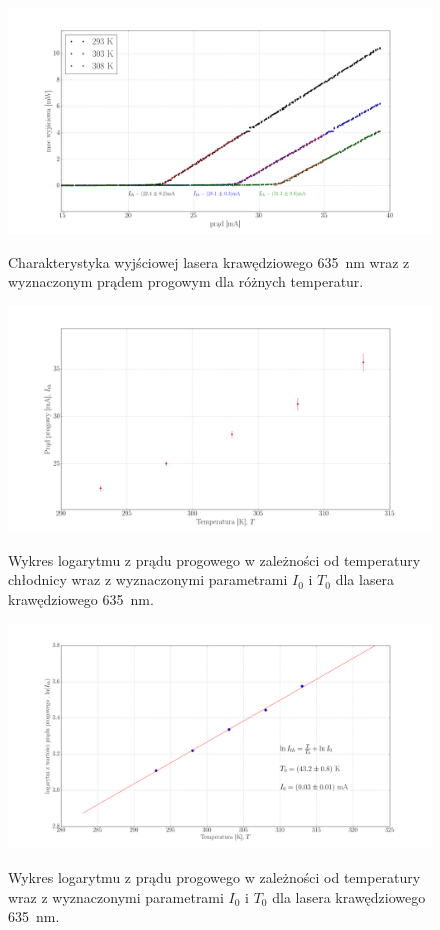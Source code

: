 \documentclass[a4paper, portrait,12pt]{report}
\begin{document}
\begin{figure}
\center
  \includegraphics[scale=0.30]{plot635/plot_3_i_th.png}
  \label{rys1}
  \caption{Charakterystyka wyjściowej lasera krawędziowego 635 \,nm wraz z wyznaczonym prądem progowym dla różnych temperatur.} 
\end{figure}

\begin{figure}
\center
  \includegraphics[scale=0.30]{plot635/plot_lin_i_th.png}
  \label{rys1}
  \caption{Wykres logarytmu z prądu progowego w zależności od temperatury chłodnicy wraz z wyznaczonymi parametrami $I_0$ i $T_0$ dla lasera krawędziowego 635 \,nm.} 
\end{figure}

\begin{figure}
\center
  \includegraphics[scale=0.30]{plot635/fit_i_0.png}
  \label{rys1}
  \caption{Wykres logarytmu z prądu progowego w zależności od temperatury wraz z wyznaczonymi parametrami $I_0$ i $T_0$ dla lasera krawędziowego 635 \,nm.} 
\end{figure}
\end{document}
